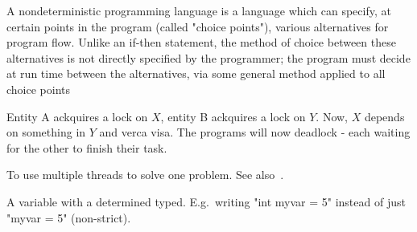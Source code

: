 \begin{definition}\label{nondeterministicprog}
    A nondeterministic programming language is a language which can specify, at
    certain points in the program (called "choice points"), various alternatives
    for program flow. Unlike an if-then statement, the method of choice between
    these alternatives is not directly specified by the programmer; the program
    must decide at run time between the alternatives, via some general method
    applied to all choice points

\end{definition}

\begin{definition}
    Entity A ackquires a lock on $X$, entity B ackquires a lock on $Y$.
    Now, $X$ depends on something in $Y$ and verca visa. The programs will
    now deadlock - each waiting for the other to finish their task.

\end{definition}

\begin{definition}[Parallelism]\label{parallelism}
    To use multiple threads to solve one problem. See
    also~.

\end{definition}

\begin{definition}
    A variable with a determined typed. E.g.\ writing "int myvar = 5" instead
    of just "myvar = 5" (non-strict).

\end{definition}
